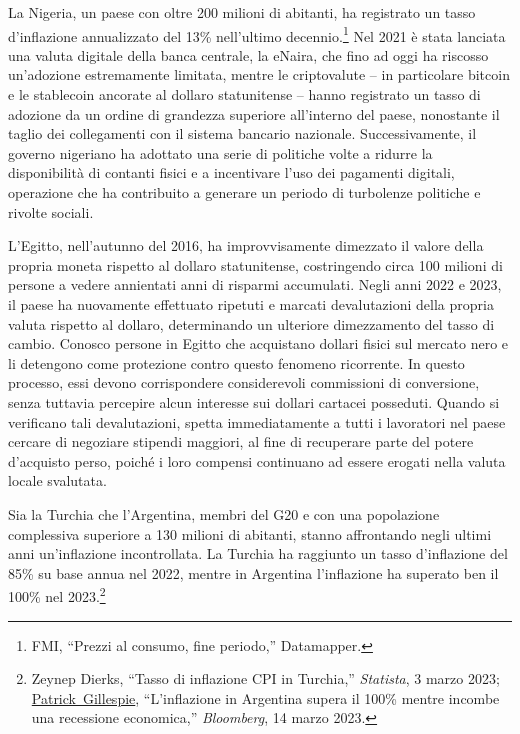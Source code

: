 \documentclass[
  a5paper,
  smalldemyvopaper,10pt,twoside,onecolumn,openright,extrafontsizes,hidelinks]{memoir}
\begin{document}
La Nigeria, un paese con oltre 200 milioni di abitanti, ha registrato un
tasso d'inflazione annualizzato del 13\% nell'ultimo
decennio.\footnote{FMI, ``Prezzi al consumo, fine periodo,'' Datamapper.}
Nel 2021 è stata lanciata una valuta digitale della banca centrale, la
eNaira, che fino ad oggi ha riscosso un'adozione estremamente limitata,
mentre le criptovalute -- in particolare bitcoin e le stablecoin
ancorate al dollaro statunitense -- hanno registrato un tasso di
adozione da un ordine di grandezza superiore all'interno del paese,
nonostante il taglio dei collegamenti con il sistema bancario nazionale.
Successivamente, il governo nigeriano ha adottato una serie di politiche
volte a ridurre la disponibilità di contanti fisici e a incentivare
l'uso dei pagamenti digitali, operazione che ha contribuito a generare
un periodo di turbolenze politiche e rivolte sociali.

L'Egitto, nell'autunno del 2016, ha improvvisamente dimezzato il valore
della propria moneta rispetto al dollaro statunitense, costringendo
circa 100 milioni di persone a vedere annientati anni di risparmi
accumulati. Negli anni 2022 e 2023, il paese ha nuovamente effettuato
ripetuti e marcati devalutazioni della propria valuta rispetto al
dollaro, determinando un ulteriore dimezzamento del tasso di cambio.
Conosco persone in Egitto che acquistano dollari fisici sul mercato nero
e li detengono come protezione contro questo fenomeno ricorrente. In
questo processo, essi devono corrispondere considerevoli commissioni di
conversione, senza tuttavia percepire alcun interesse sui dollari
cartacei posseduti. Quando si verificano tali devalutazioni, spetta
immediatamente a tutti i lavoratori nel paese cercare di negoziare
stipendi maggiori, al fine di recuperare parte del potere d'acquisto
perso, poiché i loro compensi continuano ad essere erogati nella valuta
locale svalutata.

Sia la Turchia che l'Argentina, membri del G20 e con una popolazione
complessiva superiore a 130 milioni di abitanti, stanno affrontando
negli ultimi anni un'inflazione incontrollata. La Turchia ha raggiunto
un tasso d'inflazione del 85\% su base annua nel 2022, mentre in
Argentina l'inflazione ha superato ben il 100\% nel 2023.\footnote{Zeynep
  Dierks, ``Tasso di inflazione CPI in Turchia,'' \emph{Statista}, 3
  marzo 2023;
  \href{https://www.bloomberg.com/authors/ATpJM4rxzpI/patrick-gillespie}{Patrick~Gillespie},
  ``L'inflazione in Argentina supera il 100\% mentre incombe una
  recessione economica,'' \emph{Bloomberg}, 14 marzo 2023.}
\end{document}
